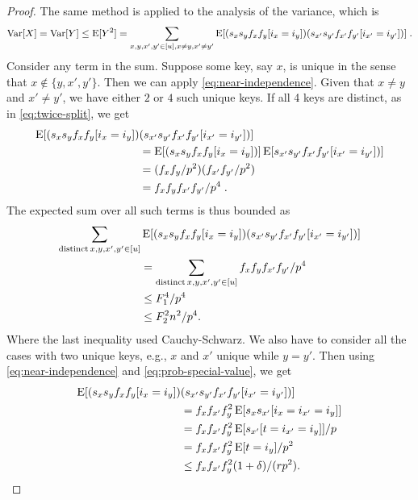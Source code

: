 \begin{proof}
    The same method is applied to the analysis of the variance, which is
    \[
        \operatorname*{Var}[X]
            = \operatorname*{Var}[Y]
            \le \operatorname*{E}[Y^2]
            = \sum_{x,y,x',y' \in [u], x \neq y, x' \neq y'} \operatorname*{E}[(s_x s_y f_x f_y [i_x = i_y]) (s_{x'} s_{y'} f_{x'} f_{y'}[i_{x'} = i_{y'}])]
        \; .
    \] 
    Consider any term in the sum. Suppose some key, say $x$, is unique in the
    sense that $x \not \in \{y,x',y'\}$. Then we can apply \cref{eq:near-independence}.
    Given that $x \neq y$ and $x'\neq y'$, we have either $2$ or $4$ such unique keys.
    If all 4 keys are distinct, as in \cref{eq:twice-split}, we get
    \begin{align*}
        \operatorname*{E}[(s_x s_y f_x f_y [i_x = i_y]) &(s_{x'} s_{y'} f_{x'} f_{y'}[i_{x'} = i_{y'}])]
            \\&= \operatorname*{E}[(s_x s_y f_x f_y [i_x = i_y])] \operatorname*{E}[s_{x'} s_{y'} f_{x'} f_{y'}[i_{x'} = i_{y'}])]
            \\&= (f_x f_y/p^2)(f_{x'} f_{y'}/p^2)
            \\&= f_x f_y f_{x'} f_{y'}/p^4
        \; .
    \end{align*}
    The expected sum over all such terms is thus bounded
    as 
    \begin{equation}\begin{split}
        \sum_{{\rm distinct}\, x,y,x',y'\in[u]}& \operatorname*{E}[(s_x s_y f_x f_y [i_x = i_y]) (s_{x'} s_{y'} f_{x'} f_{y'}[i_{x'} = i_{y'}])]
            \\&= \sum_{{\rm distinct}\,x,y,x',y'\in[u]} f_xf_yf_{x'}f_{y'}/p^4
            \\&\le F_1^4 /p^4
            \\&\le F_2^2 n^2/p^4.\label{eq:distinct}
    \end{split}\end{equation}
    Where the last inequality used Cauchy-Schwarz. We also have to consider all the cases with
    two unique keys, e.g., $x$ and $x'$ unique while $y=y'$. Then using \cref{eq:near-independence}
    and \cref{eq:prob-special-value}, we get
    \begin{align*}
        \E[(s_x s_y f_x f_y [i_x = i_y]) &(s_{x'} s_{y'} f_{x'} f_{y'}[i_{x'} = i_{y'}])]
            \\&= f_x f_{x'} f_y^2 \E[s_x s_{x'} [i_x = i_{x'} = i_y]]
            \\&= f_x f_{x'} f_y^2 \E[s_{x'} [t = i_{x'} = i_y]]/p
            \\&= f_x f_{x'} f_y^2 \E[t = i_y]/p^2
            \\&\le f_x f_{x'} f_y^2(1 + \delta)/(rp^2).

\end{align*}
\end{proof}
